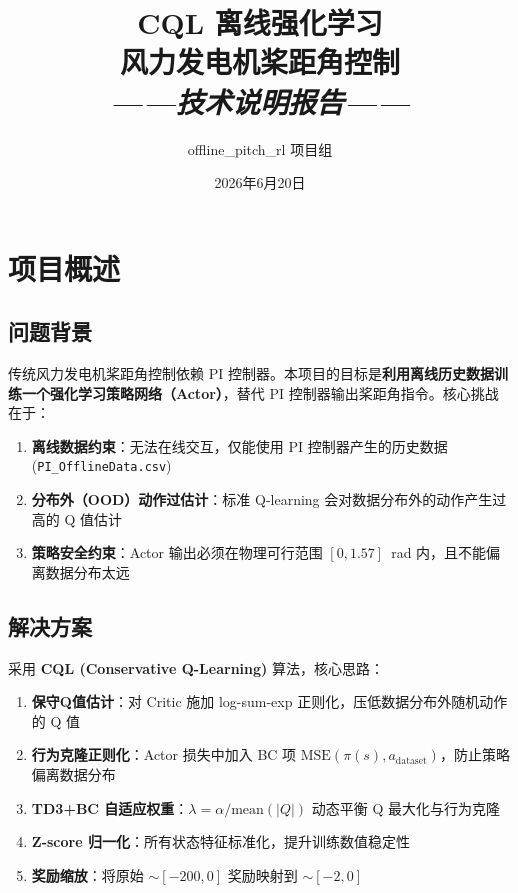 \documentclass[11pt,a4paper]{ctexart}
\title{
    \vspace{2cm}
    {\huge \textbf{CQL 离线强化学习}}\\[0.3cm]
    {\huge \textbf{风力发电机桨距角控制}}\\[0.8cm]
    {\large \textit{——技术说明报告——}}
}
\author{offline\_pitch\_rl 项目组}
\date{2026年6月20日}
\newcommand{\file}[1]{\texttt{#1}}
\begin{document}
\maketitle
\thispagestyle{empty}
\newpage

\setcounter{page}{1}
\tableofcontents
\newpage

\section{项目概述}

\subsection{问题背景}

传统风力发电机桨距角控制依赖 PI 控制器。本项目的目标是\textbf{利用离线历史数据训练一个强化学习策略网络（Actor）}，替代 PI 控制器输出桨距角指令。核心挑战在于：

\begin{enumerate}
    \item \textbf{离线数据约束}：无法在线交互，仅能使用 PI 控制器产生的历史数据 (\file{PI\_OfflineData.csv})
    \item \textbf{分布外（OOD）动作过估计}：标准 Q-learning 会对数据分布外的动作产生过高的 Q 值估计
    \item \textbf{策略安全约束}：Actor 输出必须在物理可行范围 $[0, 1.57]$~rad 内，且不能偏离数据分布太远
\end{enumerate}

\subsection{解决方案}

采用 \textbf{CQL (Conservative Q-Learning)} 算法，核心思路：

\begin{enumerate}
    \item \textbf{保守Q值估计}：对 Critic 施加 log-sum-exp 正则化，压低数据分布外随机动作的 Q 值
    \item \textbf{行为克隆正则化}：Actor 损失中加入 BC 项 $\text{MSE}(\pi(s), a_{\text{dataset}})$，防止策略偏离数据分布
    \item \textbf{TD3+BC 自适应权重}：$\lambda = \alpha / \text{mean}(|Q|)$ 动态平衡 Q 最大化与行为克隆
    \item \textbf{Z-score 归一化}：所有状态特征标准化，提升训练数值稳定性
    \item \textbf{奖励缩放}：将原始 $\sim[-200, 0]$ 奖励映射到 $\sim[-2, 0]$
\end{enumerate}
\end{document}
